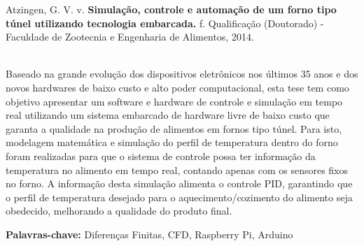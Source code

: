 \newpage

\label{resumo}
Atzingen, G. V. v. \textbf{Simulação, controle e automação de um forno tipo túnel utilizando tecnologia embarcada.} \pageref{LastPage} f. Qualificação (Doutorado) - Faculdade de Zootecnia e Engenharia de Alimentos, 2014.

\noindent
\\Baseado na grande evolução dos dispositivos eletrônicos nos últimos 35 anos e dos novos hardwares de baixo custo e alto poder computacional, esta tese tem como objetivo apresentar um software e hardware de controle e simulação em tempo real utilizando um sistema embarcado de hardware livre de baixo custo que garanta a qualidade na produção de alimentos em fornos tipo túnel. Para isto, modelagem matemática e simulação do perfil de temperatura dentro do forno foram realizadas para que o sistema de controle possa ter informação da temperatura no alimento em tempo real, contando apenas com os sensores fixos no forno. A informação desta simulação alimenta o controle PID, garantindo que o perfil de temperatura desejado para o aquecimento/cozimento do alimento seja obedecido, melhorando a qualidade do produto final.

\par
\vspace{1em}
\noindent\textbf{Palavras-chave:} Diferenças Finitas, CFD, Raspberry Pi, Arduino